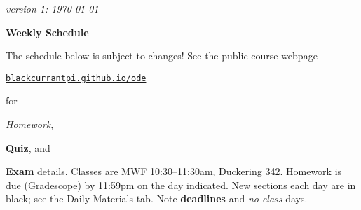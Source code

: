\documentclass[12pt]{article}
\newcommand{\vacinline}[1]{{\color{OliveGreen} \textsl{#1}}}
\newcommand{\due}[1]{\strut {\color{BrickRed} \textsl{#1}}}
\newcommand{\ee}[1]{\strut {\color{Blue} \textbf{#1}}}
\newcommand{\dlinline}[1]{{\color{Purple} \textbf{#1}}}
\begin{document}
\hfill \small \emph{version 1: \today} \normalsize

\bigskip\bigskip
\centerline{\Large \textbf{Weekly Schedule}}

\bigskip
The schedule below is subject to changes!  See the public course webpage

\medskip

\centerline{\href{https://blackcurrantpi.github.io/ode}{\texttt{blackcurrantpi.github.io/ode}}}

\noindent for \due{Homework}, \ee{Quiz}, and \ee{Exam} details.  Classes are MWF 10:30--11:30am, Duckering 342.  Homework is due (Gradescope) by 11:59pm on the day indicated.  New sections each day are in black; see the Daily Materials tab.  Note \dlinline{deadlines} and \vacinline{no class} days.

\bigskip
\end{document}
